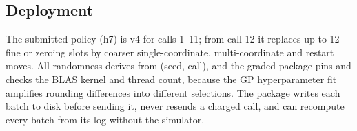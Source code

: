 \subsection{Deployment}
\label{sec:deploy}
The submitted policy (h7) is v4 for calls 1--11; from call 12 it replaces up to 12 fine or zeroing slots by coarser
single-coordinate, multi-coordinate and restart moves. All randomness derives from (seed, call), and the graded
package pins and checks the BLAS kernel and thread count, because the GP hyperparameter fit amplifies rounding differences into
different selections. The package writes each batch to disk before sending it, never resends a charged call, and
can recompute every batch from its log without the simulator.
